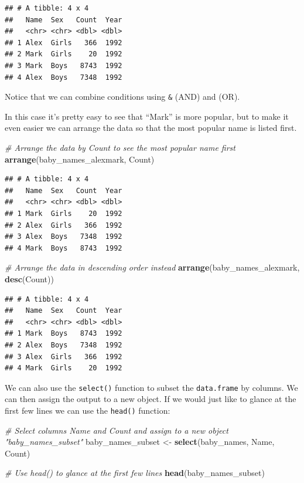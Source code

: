 \documentclass[
]{book}
\newenvironment{Shaded}{\begin{snugshade}}{\end{snugshade}}
\newcommand{\CommentTok}[1]{\textcolor[rgb]{0.56,0.35,0.01}{\textit{#1}}}
\newcommand{\KeywordTok}[1]{\textcolor[rgb]{0.13,0.29,0.53}{\textbf{#1}}}
\newcommand{\NormalTok}[1]{#1}
\newcommand{\StringTok}[1]{\textcolor[rgb]{0.31,0.60,0.02}{#1}}
\begin{document}
\begin{verbatim}
## # A tibble: 4 x 4
##   Name  Sex   Count  Year
##   <chr> <chr> <dbl> <dbl>
## 1 Alex  Girls   366  1992
## 2 Mark  Girls    20  1992
## 3 Mark  Boys   8743  1992
## 4 Alex  Boys   7348  1992
\end{verbatim}

Notice that we can combine conditions using \texttt{\&} (AND) and \texttt{\textbar{}} (OR).

In this case it's pretty easy to see that ``Mark'' is more popular, but to make it even easier we can arrange the data so that the most popular name is listed first.

\begin{Shaded}
\begin{Highlighting}[]
\CommentTok{\# Arrange the data by Count to see the most popular name first}
\KeywordTok{arrange}\NormalTok{(baby\_names\_alexmark, Count)}
\end{Highlighting}
\end{Shaded}

\begin{verbatim}
## # A tibble: 4 x 4
##   Name  Sex   Count  Year
##   <chr> <chr> <dbl> <dbl>
## 1 Mark  Girls    20  1992
## 2 Alex  Girls   366  1992
## 3 Alex  Boys   7348  1992
## 4 Mark  Boys   8743  1992
\end{verbatim}

\begin{Shaded}
\begin{Highlighting}[]
\CommentTok{\# Arrange the data in descending order instead}
\KeywordTok{arrange}\NormalTok{(baby\_names\_alexmark, }\KeywordTok{desc}\NormalTok{(Count))}
\end{Highlighting}
\end{Shaded}

\begin{verbatim}
## # A tibble: 4 x 4
##   Name  Sex   Count  Year
##   <chr> <chr> <dbl> <dbl>
## 1 Mark  Boys   8743  1992
## 2 Alex  Boys   7348  1992
## 3 Alex  Girls   366  1992
## 4 Mark  Girls    20  1992
\end{verbatim}

We can also use the \texttt{select()} function to subset the \texttt{data.frame} by columns. We can then assign the output to a new object. If we would just like to glance at the first few lines we can use the \texttt{head()} function:

\begin{Shaded}
\begin{Highlighting}[]
\CommentTok{\# Select columns Name and Count and assign to a new object "baby\_names\_subset"}
\NormalTok{baby\_names\_subset \textless{}{-}}\StringTok{ }\KeywordTok{select}\NormalTok{(baby\_names, Name, Count)}

\CommentTok{\# Use head() to glance at the first few lines}
\KeywordTok{head}\NormalTok{(baby\_names\_subset)}
\end{Highlighting}
\end{Shaded}
\end{document}
